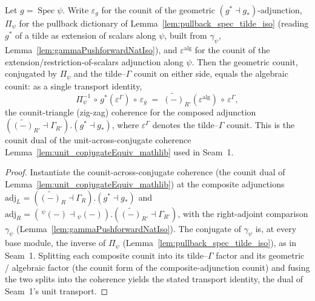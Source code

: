 \begin{lemma}

  \label{lem:base_change_mate_gstar_counit_transport}
  Let \(g = \operatorname{Spec}\psi\). Write \(\varepsilon_g\) for the counit of the geometric
  \((g^* \dashv g_*)\)-adjunction, \(\Pi_{\psi}\) for the pullback dictionary of
  Lemma~\ref{lem:pullback_spec_tilde_iso} (reading \(g^*\) of a tilde as extension of scalars along
  \(\psi\), built from \(\gamma_{\psi}\), Lemma~\ref{lem:gammaPushforwardNatIso}), and
  \(\varepsilon^{\mathrm{alg}}\) for the counit of the extension/restriction-of-scalars adjunction
  along \(\psi\). Then the geometric counit, conjugated by \(\Pi_{\psi}\) and the tilde--\(\Gamma\)
  counit on either side, equals the algebraic counit: as a single transport identity,
  \[
    \Pi_{\psi}^{-1} \,\circ\, g^*(\varepsilon^{\Gamma}) \,\circ\, \varepsilon_g
    \;=\;
    \widetilde{(-)}_{R'}(\varepsilon^{\mathrm{alg}}) \,\circ\, \varepsilon^{\Gamma},
  \]
  the counit-triangle (zig-zag) coherence for the composed adjunction
  \((\widetilde{(-)}_{R'} \dashv \Gamma_{R'}) . (g^* \dashv g_*)\), where \(\varepsilon^{\Gamma}\)
  denotes the tilde--\(\Gamma\) counit. This is the counit dual of the unit-across-conjugate
  coherence Lemma~\ref{lem:unit_conjugateEquiv_mathlib} used in Seam~1.
\end{lemma}
\begin{proof}
  Instantiate the counit-across-conjugate coherence (the counit dual of
  Lemma~\ref{lem:unit_conjugateEquiv_mathlib}) at the composite adjunctions
  \(\mathrm{adj}_L = (\widetilde{(-)}_R \dashv \Gamma_R) . (g^* \dashv g_*)\) and
  \(\mathrm{adj}_R = (\,{}^{\psi}\!(-) \dashv {}_{\psi}(-)) . (\widetilde{(-)}_{R'} \dashv
  \Gamma_{R'})\), with the right-adjoint comparison \(\gamma_{\psi}\)
  (Lemma~\ref{lem:gammaPushforwardNatIso}). The conjugate of \(\gamma_{\psi}\) is, at every base
  module, the inverse of \(\Pi_{\psi}\) (Lemma~\ref{lem:pullback_spec_tilde_iso}), as in Seam~1.
  Splitting each composite counit into its tilde--\(\Gamma\) factor and its geometric / algebraic
  factor (the counit form of the composite-adjunction counit) and fusing the two splits into the
  coherence yields the stated transport identity, the dual of Seam~1's unit transport.
\end{proof}

